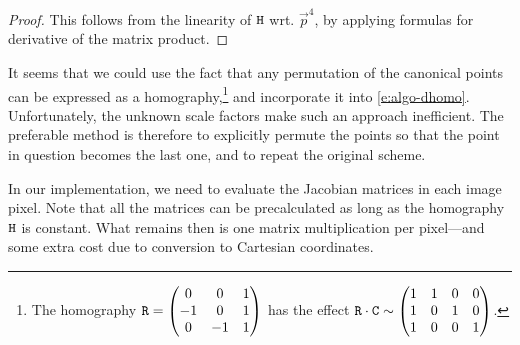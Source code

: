 \begin{proof}
This follows from the linearity of $\mathtt{H}$ wrt. $\vec p^4$, by applying formulas for derivative of the matrix product.
\end{proof}

It seems that we could use the fact that any permutation of the canonical points can be expressed as a homography,\footnote{
The homography $\mathtt{R} = \begin{pmatrix}
 0 & 0 & 1 \\
 -1 & 0 & 1 \\
 0 & -1 & 1
 \end{pmatrix}$ has the effect $\mathtt{R} \cdot \mathtt{C} \sim \begin{pmatrix}
 1 & 1 & 0 & 0 \\
 1 & 0 & 1 & 0 \\
 1 & 0 & 0 & 1
 \end{pmatrix}$.
} and incorporate it into \eqref{e:algo-dhomo}.
Unfortunately, the unknown scale factors make such an approach inefficient.
The preferable method is therefore to explicitly permute the points so that the point in question becomes the last one, and to repeat the original scheme.

In our implementation, we need to evaluate the Jacobian matrices in each image pixel.
Note that all the matrices can be precalculated as long as the homography $\mathtt{H}$ is constant.
What remains then is one matrix multiplication per pixel---and some extra cost due to conversion to Cartesian coordinates.

